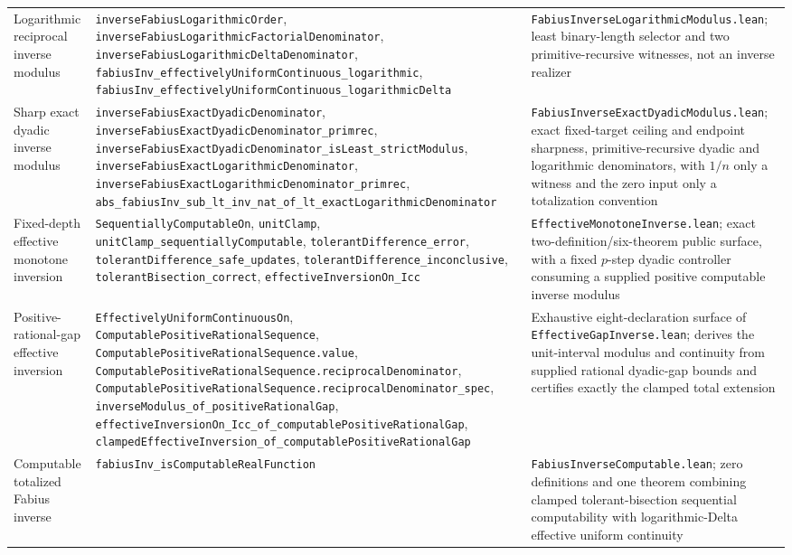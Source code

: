 \documentclass[11pt,oneside]{article}
\theoremstyle{definition}
\theoremstyle{remark}
\begin{document}
\begin{longtable}{@{}>{\raggedright\arraybackslash}p{} >{\raggedright\arraybackslash}p{} >{\raggedright\arraybackslash}p{}@{}}
Logarithmic reciprocal inverse modulus & \nolinkurl{inverseFabiusLogarithmicOrder}, \nolinkurl{inverseFabiusLogarithmicFactorialDenominator}, \nolinkurl{inverseFabiusLogarithmicDeltaDenominator}, \nolinkurl{fabiusInv_effectivelyUniformContinuous_logarithmic}, \nolinkurl{fabiusInv_effectivelyUniformContinuous_logarithmicDelta} & \nolinkurl{FabiusInverseLogarithmicModulus.lean}; least binary-length selector and two primitive-recursive witnesses, not an inverse realizer \\
Sharp exact dyadic inverse modulus & \nolinkurl{inverseFabiusExactDyadicDenominator}, \nolinkurl{inverseFabiusExactDyadicDenominator_primrec}, \nolinkurl{inverseFabiusExactDyadicDenominator_isLeast_strictModulus}, \nolinkurl{inverseFabiusExactLogarithmicDenominator}, \nolinkurl{inverseFabiusExactLogarithmicDenominator_primrec}, \nolinkurl{abs_fabiusInv_sub_lt_inv_nat_of_lt_exactLogarithmicDenominator} & \nolinkurl{FabiusInverseExactDyadicModulus.lean}; exact fixed-target ceiling and endpoint sharpness, primitive-recursive dyadic and logarithmic denominators, with \(1/n\) only a witness and the zero input only a totalization convention \\
Fixed-depth effective monotone inversion & \nolinkurl{SequentiallyComputableOn}, \nolinkurl{unitClamp}, \nolinkurl{unitClamp_sequentiallyComputable}, \nolinkurl{tolerantDifference_error}, \nolinkurl{tolerantDifference_safe_updates}, \nolinkurl{tolerantDifference_inconclusive}, \nolinkurl{tolerantBisection_correct}, \nolinkurl{effectiveInversionOn_Icc} & \nolinkurl{EffectiveMonotoneInverse.lean}; exact two-definition/six-theorem public surface, with a fixed \(p\)-step dyadic controller consuming a supplied positive computable inverse modulus \\
Positive-rational-gap effective inversion & \nolinkurl{EffectivelyUniformContinuousOn}, \nolinkurl{ComputablePositiveRationalSequence}, \nolinkurl{ComputablePositiveRationalSequence.value}, \nolinkurl{ComputablePositiveRationalSequence.reciprocalDenominator}, \nolinkurl{ComputablePositiveRationalSequence.reciprocalDenominator_spec}, \nolinkurl{inverseModulus_of_positiveRationalGap}, \nolinkurl{effectiveInversionOn_Icc_of_computablePositiveRationalGap}, \nolinkurl{clampedEffectiveInversion_of_computablePositiveRationalGap} & Exhaustive eight-declaration surface of \nolinkurl{EffectiveGapInverse.lean}; derives the unit-interval modulus and continuity from supplied rational dyadic-gap bounds and certifies exactly the clamped total extension \\
Computable totalized Fabius inverse & \nolinkurl{fabiusInv_isComputableRealFunction} & \nolinkurl{FabiusInverseComputable.lean}; zero definitions and one theorem combining clamped tolerant-bisection sequential computability with logarithmic-Delta effective uniform continuity \\

\end{longtable}
\end{document}
